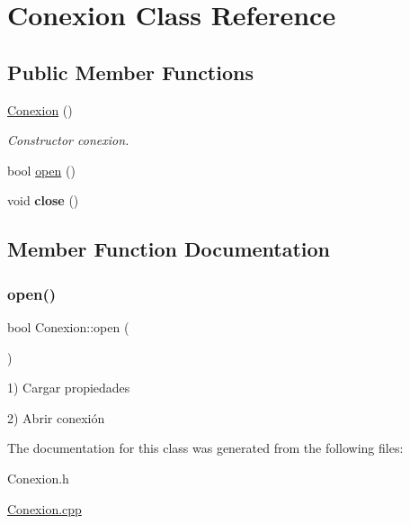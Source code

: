 \hypertarget{classConexion}{}\section{Conexion Class Reference}
\label{classConexion}
\subsection*{Public Member Functions}
\begin{DoxyCompactItemize}
\item 
\mbox{\label{classConexion_aba0281e06667725e147fa891e8a82fb3}} 
\mbox{\hyperlink{classConexion_aba0281e06667725e147fa891e8a82fb3}{Conexion}} ()
\begin{DoxyCompactList}\small\item\em Constructor conexion. \end{DoxyCompactList}\item 
bool \mbox{\hyperlink{classConexion_af697de4217c41446258b49844b4d85c1}{open}} ()
\item 
\mbox{\label{classConexion_ac83336bc48ea39ae47c2e8b0b10fba64}} 
void {\bfseries close} ()
\end{DoxyCompactItemize}


\subsection{Member Function Documentation}
\mbox{\label{classConexion_af697de4217c41446258b49844b4d85c1}} 
\subsubsection{\texorpdfstring{open()}{open()}}
{\footnotesize\ttfamily bool Conexion\+::open (\begin{DoxyParamCaption}{ }\end{DoxyParamCaption})}

1) Cargar propiedades

2) Abrir conexión 

The documentation for this class was generated from the following files\+:\begin{DoxyCompactItemize}
\item 
Conexion.\+h\item 
\mbox{\hyperlink{Conexion_8cpp}{Conexion.\+cpp}}\end{DoxyCompactItemize}
